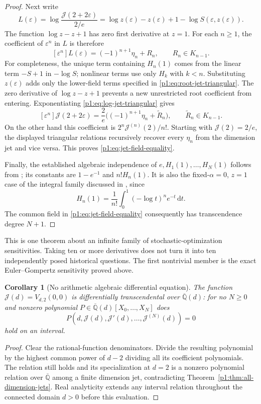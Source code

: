 \documentclass[11pt,a4paper]{article}
\newtheorem{corollary}[theorem]{Corollary}
\theoremstyle{definition}
\theoremstyle{remark}
\numberwithin{equation}{section}
\begin{document}
\begin{proof}
Next write
\[
 L(\varepsilon)=
 \log\frac{\mathcal J(2+2\varepsilon)}{2/e}
 =\log z(\varepsilon)-z(\varepsilon)+1
   -\log S(\varepsilon,z(\varepsilon)).
\]
The function $\log z-z+1$ has zero first derivative at $z=1$.
For each $n\ge1$, the coefficient of $\varepsilon^n$ in $L$ is
therefore
\begin{equation}\label{p1:eq:log-jet-triangular}
 [\varepsilon^n]L(\varepsilon)
 =(-1)^{n+1}\eta_n+R_n,\qquad R_n\in K_{n-1}.
\end{equation}
For completeness, the unique term containing $H_n(1)$ comes from the
linear term $-S+1$ in $-\log S$; nonlinear terms use only $H_k$ with
$k<n$. Substituting $z(\varepsilon)$ adds only the lower-field terms
specified in \eqref{p1:eq:root-jet-triangular}. The zero derivative of
$\log z-z+1$ prevents a new unrestricted root coefficient from entering.
Exponentiating \eqref{p1:eq:log-jet-triangular} gives
\[
 [\varepsilon^n]\mathcal J(2+2\varepsilon)
 =\frac2e\bigl((-1)^{n+1}\eta_n+\widetilde R_n\bigr),
 \qquad\widetilde R_n\in K_{n-1}.
\]
On the other hand this coefficient is
$2^n\mathcal J^{(n)}(2)/n!$. Starting with
$\mathcal J(2)=2/e$, the displayed triangular relations recursively
recover every $\eta_n$ from the dimension jet and vice versa. This
proves \eqref{p1:eq:jet-field-equality}.

Finally, the established algebraic independence of
$e,H_1(1),\ldots,H_N(1)$ follows from
\cite[Theorem~2]{p1:Powers2026}; its constants are
$1-e^{-1}$ and $n!H_n(1)$. It is also the fixed-$\alpha=0$, $z=1$
case of the integral family discussed in \cite[Section~7]{p1:Rivoal2012},
since
\[
 H_n(1)=\frac1{n!}\int_0^1(-\log t)^n e^{-t}\,\mathrm dt.
\]
The common field in \eqref{p1:eq:jet-field-equality} consequently has
transcendence degree $N+1$.
\end{proof}

This is one theorem about an infinite family of stochastic-optimization
sensitivities. Taking ten or more derivatives does not turn it into ten
independently posed historical questions. The first nontrivial member
is the exact Euler--Gompertz sensitivity proved above.


\begin{corollary}[No arithmetic algebraic differential equation]
\label{p1:cor:dimension-differential-transcendence}
The function $\mathcal J(d)=V_{d,2}(0,0)$ is differentially
transcendental over $\overline{\mathbb Q}(d)$: for no $N\ge0$ and
nonzero polynomial
$P\in\overline{\mathbb Q}(d)[X_0,\ldots,X_N]$ does
\[
 P(d,\mathcal J(d),\mathcal J'(d),\ldots,
                 \mathcal J^{(N)}(d))=0
\]
hold on an interval.
\end{corollary}
\begin{proof}
Clear the rational-function denominators. Divide the resulting
polynomial by the highest common power of $d-2$ dividing all its
coefficient polynomials. The relation still holds and its
specialization at $d=2$ is a nonzero polynomial relation over
$\overline{\mathbb Q}$ among a finite dimension jet, contradicting
Theorem~\ref{p1:thm:all-dimension-jets}. Real analyticity extends any
interval relation throughout the connected domain $d>0$ before this
evaluation.
\end{proof}
\end{document}
